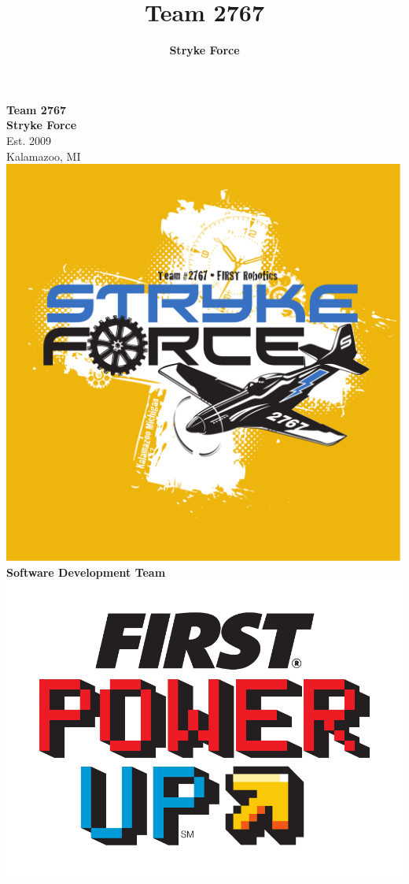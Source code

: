 \documentclass[10pt,tumble]{leaflet}
\title{Team 2767}
\author{\Large\textbf{Stryke Force}}
\begin{document}
\begin{center}
 \LARGE\textbf{Team 2767\\ Stryke Force}\\
 \Large{Est. 2009\\ Kalamazoo, MI}\\
 \vspace{0.5in}
 \includegraphics[scale=0.2]{assets/strykeforce}\\
 \vspace{0.5in}
 \LARGE\textbf{Software Development Team}
 \vfill
 \includegraphics[scale=0.4]{assets/FIRST-FRC18-PowerUp-Stack}
\end{center}
\end{document}
